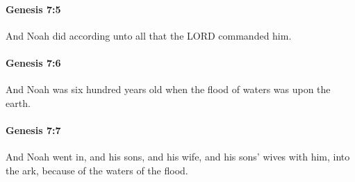 		\paragraph{Genesis 7:5} %
			\label{GENESIS-7-5}

			And Noah did according unto all that the LORD commanded him.


		\paragraph{Genesis 7:6} %
			\label{GENESIS-7-6}

			And Noah was six hundred years old when the flood of waters was upon the earth.


		\paragraph{Genesis 7:7} %
			\label{GENESIS-7-7}

			And Noah went in, and his sons, and his wife, and his sons' wives with him, into the ark, because of the waters of the flood.


